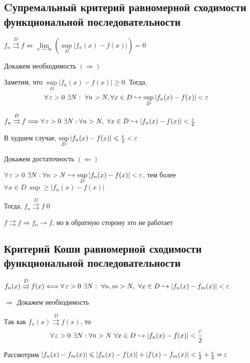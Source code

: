 \documentclass[a4paper]{article}
\begin{document}
\subsection{Cупремальный критерий равномерной сходимости функциональной последовательности}
\theorem $f_n\overset{D}{\rightrightarrows} f\Longleftrightarrow \lim\limits_{n\to\infty}\left(\sup\limits_{D} \left|f_n(x)-f(x)\right|\right)=0$

\proof Докажем необходимость $(\Longrightarrow)$

Заметим, что $\sup\limits_{D} \left|f_n(x)-f(x)\right|\geqslant 0$. Тогда,
\begin{equation*}
    \forall\ve >0\ \exists N:\ \forall n>N,\forall x\in D\hookrightarrow \sup\limits_D |f_n(x)-f(x)|<\ve
\end{equation*}

$f_n\overset{D}{\rightrightarrows} f\Longrightarrow \forall\operatorname{\varepsilon}>0\ \exists N:\forall n>N,\ \forall x\in D\hookrightarrow|f_n(x)-f(x)|<\frac{\operatorname{\varepsilon}}{2}$

В худшем случае, $\sup\limits_{D} |f_n(x)-f(x)|\leqslant \frac{\operatorname{\varepsilon}}{2}<\operatorname{\varepsilon}$

\proof Докажем достаточность $(\Longleftarrow)$

$\forall \operatorname{\varepsilon}>0\ \exists N:\forall n>N\hookrightarrow\sup\limits_{D}|f_n(x)-f(x)|<\operatorname{\varepsilon}$, тем более $\forall x\in D\ \sup \geqslant |f_n(x)-f(x)|$ 

Тогда, $f_n\overset{D}{\rightrightarrows} f$\qed 

\comment $f\rightrightarrows f\Longrightarrow f_n\longrightarrow f$, но в обратную сторону это не работает


\subsection{Критерий Коши равномерной сходимости функциональной последовательности}
\theorem $f_n(x)\overset{D}{\rightrightarrows} f(x)\Longleftrightarrow\forall\ve>0\ \exists N:\ \forall n,m>N,\ \forall x\in D\hookrightarrow |f_n(x)-f_m(x)|<\ve$

\proof $\Longrightarrow$ Докажем необходимость

Так как $f_n(x)\overset{D}{\rightrightarrows} f(x)$, то
\begin{equation*}
    \forall\operatorname{\varepsilon}>0\ \exists N:\forall n>N\ \forall x\in D\hookrightarrow |f_n(x)-f(x)|<\frac{\operatorname{\varepsilon}}{2}
\end{equation*}

Рассмотрим $|f_n(x)-f_m(x)|\leqslant |f_n(x)-f(x)|+|f(x)-f_m(x)|<\frac{\operatorname{\varepsilon}}{2}+\frac{\operatorname{\varepsilon}}{2}=\operatorname{\varepsilon}$
\end{document}
